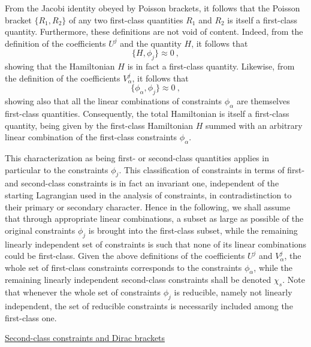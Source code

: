 \documentclass[a4paper,11pt]{article}
\begin{document}
From the Jacobi identity obeyed by Poisson brackets, it follows
that the Poisson bracket $\{R_1,R_2\}$ of any two first-class
quantities $R_1$ and $R_2$ is itself a first-class quantity. Furthermore,
these definitions are not void of content. Indeed, from the definition
of the coefficients $U^j$ and the quantity $H$, it follows that
\begin{equation}
\{H,\phi_j\}\approx 0\ ,
\end{equation}
showing that the Hamiltonian $H$ is in fact a first-class quantity.
Likewise, from the definition of the coefficients $V^j_\alpha$, it follows
that
\begin{equation}
\{\phi_\alpha,\phi_j\}\approx 0\ ,
\end{equation}
showing also that all the linear combinations of constraints $\phi_\alpha$
are themselves first-class quantities. Consequently, the total Hamiltonian
is itself a first-class quantity, being given by the first-class Hamiltonian
$H$ summed with an arbitrary linear combination of the first-class
constraints $\phi_\alpha$.

This characterization as being first- or second-class quantities
applies in particular to the constraints $\phi_j$. This classification
of constraints in terms of first- and second-class constraints is in fact
an invariant one, independent of the starting Lagrangian used in the analysis
of constraints, in contradistinction to their primary or secondary character.
Hence in the following, we shall assume that through appropriate
linear combinations, a subset as large as possible of the original constraints
$\phi_j$ is brought into the first-class subset, while the remaining
linearly independent set of constraints is such that none of its linear
combinations could be first-class. Given the above definitions of the
coefficients $U^j$ and $V^j_\alpha$, the whole set of first-class
constraints corresponds to the constraints $\phi_\alpha$, while the
remaining linearly independent
second-class constraints shall be denoted $\chi_s$. Note that
whenever the whole set of constraints $\phi_j$ is reducible, namely
not linearly independent, the set of reducible constraints is necessarily
included among the first-class one.

\vspace{10pt}

\noindent\underline{Second-class constraints and Dirac brackets}

\vspace{5pt}
\end{document}
